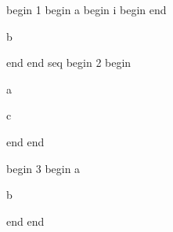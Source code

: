begin
1
begin
a
begin
i
begin
end

b

end
end
seq
begin
2
begin

a


c

end
end

begin
3
begin
a

b

end
end
